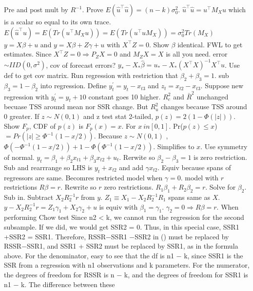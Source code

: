 Pre and post mult by $R^{-1}$.
\Q Prove $E(\hat{u}^{\top} \hat{u}) = (n-k)\sigma_0^2 $.
\A $\hat{u}^{\top} \hat{u} = u^{\top} M_X u$ which is a scalar so equal to its own trace.
$E(\hat{u}^{\top} \hat{u}) = E(Tr(u^{\top} M_X u)) = E(Tr(u^{\top}u M_X )) = \sigma^2_0 Tr(M_X)$
\Q $y = X\beta + u$ and $y = X\beta + Z\gamma + u$ with $X^{\top}Z = 0$.
Show $\beta$ identical.
\A FWL to get estimates.
Since $X^{\top}Z = 0 \Rightarrow P_Z X = 0$ and $M_Z X = X$ is all you need.
\Q error $\sim IID(0, \sigma^2)$, cov of forecast errors?
\A $y_{\ast} - X_{\ast} \hat{\beta} = u_{\ast} - X_{\ast} (X^{\top}X)^{-1} X^{\top} u$.
Use def to get cov matrix.
\Q Run regression with restriction that $\beta_2 + \beta_3 = 1$.
\A sub $\beta_3 = 1 - \beta_2$ into regression.
Define $y_t ^{\prime} = y_t - x_{t3}$ and $z_t = x_{t2} - x_{t3}$.
\Q Suppose new regression with $y_t ^{\prime} = y_t + 10$
\A constant goes 10 higher.
$R_c ^2$ and $\bar{R} ^2$ unchanged becuase TSS around mean nor SSR change.
But $R_u ^2$ changes because TSS around 0 greater.
\Q If $z \sim N(0,1)$ and z test stat 2-tailed, $p(z) = 2(1 - \Phi (\lvert z \rvert))$.
Show $F_{p}$, CDF of $p(z)$ is $F_p (x) = x$.
For $x\ in [0,1]$.
\A Pr($p(z) \leq x$) $= Pr (\lvert z \rvert \geq \Phi ^{-1} (1-x/2))$.
Because $z \sim N(0,1)$ , $\Phi (-\Phi ^{-1} (1-x / 2)) + 1 - \Phi (\Phi^{-1} (1 - x / 2))$.
Simplifies to $x$.
Use symmetry of normal.
\Q $y_t = \beta_1 + \beta_2 x_{t1} + \beta_3 x_{t2} + u_t $.
Rerwite so $\beta_2 - \beta_3 = 1$ is zero restriction.
\A Sub and rearrrange so LHS is $y_t + x_{t2}$ and add $\gamma x_{t2}$.
Equiv because spans of regressors are same.
Becomres restricted model when $\gamma = 0$.
\Q model with $r$ restrictions $R\beta = r$.
Rewrite so $r$ zero restrictions.
\A $R_1 \beta_1 + R_2 \beta_2 = r$.
Solve for $\beta_2$.
Sub in.
Subtract $X_2 R_2 ^{-1} r$ from $y$.
$Z_1 \equiv X_1 - X_2 R_2 ^{-1} R_1$ spans same as $X$.
$y - X_2 R_2 ^{-1} r = Z_1 \gamma_1 + X_2 \gamma _2 + u$ is equiv with $\beta_1 = \gamma_1$.
$\gamma_2 = 0 \Rightarrow R\beta = r$.
\Q When performing Chow test
\A Since n2 < k, we cannot run the regression for the second subsample. If we
did, we would get SSR2 = 0. Thus, in this special case, SSR1 +SSR2 = SSR1.
Therefore, RSSR−SSR1 −SSR2 in () must be replaced by RSSR−SSR1,
and SSR1 + SSR2 must be replaced by SSR1, as in the formula above.
For the denominator,  easy to see that the df is
n1 − k, since SSR1 is the SSR from a regression with n1 observations and k
parameters. For the numerator, the degrees of freedom for RSSR is n − k,
and the degrees of freedom for SSR1 is n1 − k. The difference between these
